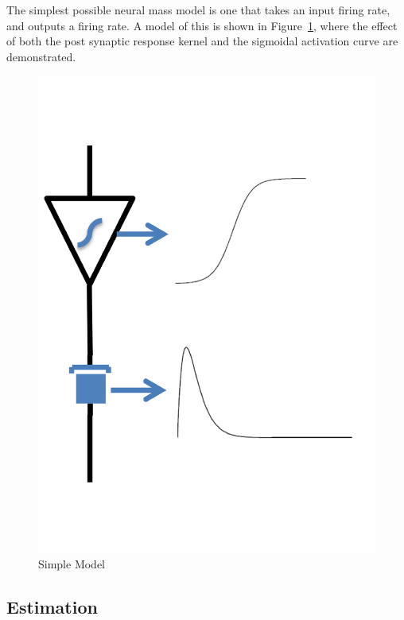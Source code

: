 \documentclass{article}%
\begin{document}
The simplest possible neural mass model is one that takes an input firing rate, and outputs a firing rate. A model of this is shown in Figure~\ref{fig: Simple}, where the effect of both the post synaptic response kernel and the sigmoidal activation curve are demonstrated.

\begin{figure}
	\centering
		\includegraphics[width =1\textwidth]{Biological_Response.pdf}
	\caption{Simple Model}
	\label{fig: Simple}
\end{figure}



\subsection{Estimation}
\end{document}
